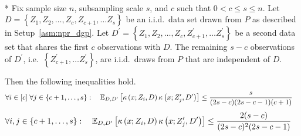 \begin{lem}[]\label{lem:expec_kernel_prod_bound}\mbox{}\\*
    Fix sample size $n$, subsampling scale $s$, and $c$ such that $0 < c \leq s \leq n$.
	Let $D = \left\{Z_1, Z_2, \dotsc, Z_c, Z_{c+1}, \dotsc Z_s \right\}$ be an i.i.d.\ data set drawn from $P$ as described in Setup~\ref{asm:npr_dgp}.
	Let $D^{\prime} = \left\{Z_1, Z_2, \dotsc, Z_c, Z_{c+1}^{\prime}, \dotsc Z_s^{\prime} \right\}$ be a second data set that shares the first $c$ observations with $D$.
	The remaining $s - c$ observations of $D^{\prime}$, i.e.\ $\left\{Z_{c+1}^{\prime}, \dotsc Z_s^{\prime} \right\}$, are i.i.d.\ draws from $P$ that are independent of $D$.

    Then the following inequalities hold.
    \begin{equation}
        \begin{aligned}
            \forall i \in [c] \; \forall j \in \{c+1, \dotsc, s\}: \quad
            \mathbb{E}_{D, D^{\prime}}\left[\kappa\left(x; Z_{i}, D\right)\kappa\left(x; Z_{j}^{\prime}, D^{\prime}\right)\right]
            & \leq \frac{s}{(2s - c)(2s-c-1)(c+1)}
        \end{aligned}
    \end{equation}
    \begin{equation}
        \begin{aligned}
            \forall i,j \in \{c+1, \dotsc, s\}: \quad
            \mathbb{E}_{D, D^{\prime}}\left[\kappa\left(x; Z_{i}, D\right)\kappa\left(x; Z_{j}^{\prime}, D^{\prime}\right)\right]
            & \leq \frac{2(s-c)}{(2s-c)^{2}(2s-c-1)}
        \end{aligned}
    \end{equation}
\end{lem}

